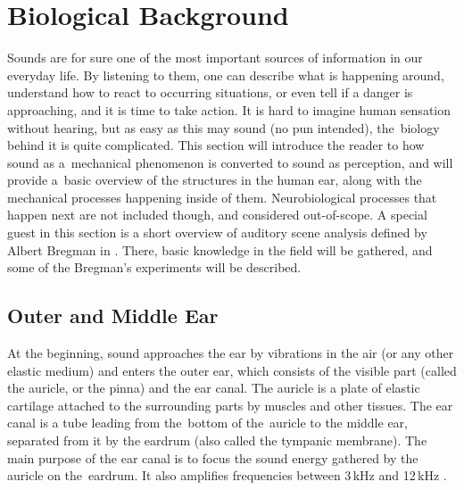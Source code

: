 \section{Biological Background}\label{chapter:biology}

Sounds are for sure one of the most important sources of information in our everyday life. By listening to them, one can describe what is happening around, understand how to react to occurring situations, or even tell if a danger is approaching, and it is time to take action. It is hard to imagine human sensation without hearing, but as easy as this may sound (no pun intended), the~biology behind it is quite complicated. This section will introduce the reader to how sound as a~mechanical phenomenon is converted to sound as perception, and will provide a~basic overview of the structures in the human ear, along with the mechanical processes happening inside of them. Neurobiological processes that happen next are not included though, and considered out-of-scope. A special guest in this section is a short overview of auditory scene analysis defined by Albert Bregman in \cite{Bregman1990}. There, basic knowledge in the field will be gathered, and some of the Bregman's experiments will be described.

\subsection{Outer and Middle Ear}

At the beginning, sound approaches the ear by vibrations in the air (or any other elastic medium) and enters the outer ear, which consists of the visible part (called the auricle, or the pinna) and the ear canal. The auricle is a plate of elastic cartilage attached to the surrounding parts by muscles and other tissues. The ear canal is a tube leading from the~bottom of the~auricle to the middle ear, separated from it by the eardrum (also called the tympanic membrane). The main purpose of the ear canal is to focus the sound energy gathered by the auricle on the~eardrum. It also amplifies frequencies between 3\,kHz and 12\,kHz \cite{Standring2008}.\\

